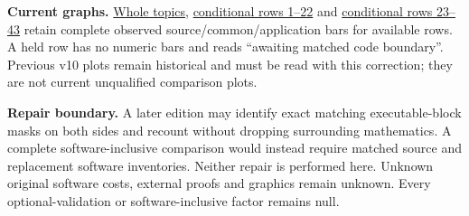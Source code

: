 \documentclass[11pt,a4paper]{article}
\begin{document}
\textbf{Current graphs.} \href{whole_topics.pdf}{Whole topics},
\href{conditional_1.pdf}{conditional rows 1--22} and
\href{conditional_2.pdf}{conditional rows 23--43} retain complete observed source/common/application bars for available rows. A held row has no numeric bars and reads ``awaiting matched code boundary''. Previous v10 plots remain historical and must be read with this correction; they are not current unqualified comparison plots.

\textbf{Repair boundary.} A later edition may identify exact matching executable-block masks on both sides and recount without dropping surrounding mathematics. A complete software-inclusive comparison would instead require matched source and replacement software inventories. Neither repair is performed here. Unknown original software costs, external proofs and graphics remain unknown. Every optional-validation or software-inclusive factor remains null.
\newpage
\end{document}
